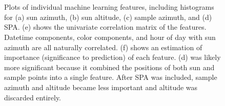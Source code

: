\begin{figure}[pos=tbp]
\begin{center}
%
~%
%
~%
%
~%
\\%
\vspace{2mm}
~%
\end{center}
\vspace{-2mm}
\caption[histograms]{Plots of individual machine learning features, including histograms for (a) sun azimuth, (b) sun altitude, (c) sample azimuth, and (d) SPA. (e) shows the univariate correlation matrix of the features. Datetime components, color components, and hour of day with sun azimuth are all naturally correlated. (f) shows an estimation of importance (significance to prediction) of each feature. (d) was likely more significant because it combined the positions of both sun and sample points into a single feature. After SPA was included, sample azimuth and altitude became less important and altitude was discarded entirely.}
\label{fig:eda}
\end{figure}

